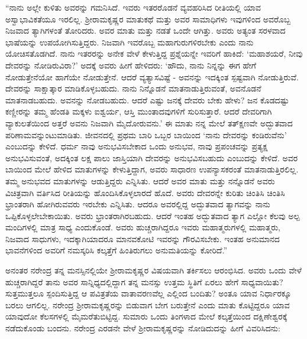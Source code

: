 “ನಾನು ಅಲ್ಲೇ ಕುಳಿತು ಅವರನ್ನು ಗಮನಿಸಿದೆ. ಇವರು ಇತರರೊಡನೆ ವ್ಯವಹರಿಸಿದ ರೀತಿಯಲ್ಲಿ ಯಾವ ಅಸ್ವಾಭಾವಿಕತೆಯೂ ಇರಲಿಲ್ಲ. ಶ‍್ರೀರಾಮಕೃಷ್ಣರ ಮಾತುಕಥೆ ಮತ್ತು ಅವರ ಸಾಮಾಧಿಗಳು ಇವುಗಳಿಂದ ಅವರೊಬ್ಬ ನಿಜವಾದ ತ್ಯಾಗಿಗಳಂತೆ ತೋರಿದರು. ಅವರ ಮಾತು ಮತ್ತು ನಡತೆ ಒಂದೇ ಆಗಿತ್ತು. ಅವರು ಅತ್ಯಂತ ಸರಳವಾದ ಭಾಷೆಯನ್ನು ಉಪಯೋಗಿಸುತ್ತಿದ್ದರು. ನಿಜವಾಗಿ ಇವರೊಬ್ಬ ಮಹಾಗುರುಗಳಿರಬೇಕು ಎಂದು ನಾನು ಯೋಚಿಸತೊಡಗಿದೆ. ನಾನು ಇತರರನ್ನು ಅನೇಕ ವೇಳೆ ಕೇಳುತ್ತಿದ್ದ ಪ್ರಶ್ನೆಯನ್ನೇ ಇವರಿಗೆ ಹಾಕಿದೆ: ‘ಮಹಾಶಯರೆ, ನೀವು ದೇವರನ್ನು ನೋಡಿರುವಿರಾ?’ ಅದಕ್ಕೆ ಅವರು ಹೀಗೆ ಹೇಳಿದರು: ‘ಹೌದು, ನಾನು ನಿನ್ನನ್ನು ಈಗ ಹೇಗೆ ನೋಡುತ್ತೇನೆಯೋ ಹಾಗೆಯೇ ನೋಡುತ್ತೇನೆ. ಆದರೆ ವ್ಯತ್ಯಾಸವಿಷ್ಟೆ - ಅವನನ್ನು ಇದಕ್ಕಿಂತ ಸ್ಪಷ್ಟವಾಗಿ ನೋಡುತ್ತಿರುವೆ. ದೇವರನ್ನು ಸಾಕ್ಷಾತ್ಕಾರ ಮಾಡಿಕೊಳ್ಳಬಹುದು. ನಾನು ನಿನ್ನೊಡನೆ ಮಾತನಾಡುತ್ತಿರುವಂತೆ, ಅವನೊಡನೆ ಮಾತನಾಡಬಹುದು. ಅವನನ್ನು ನೋಡಬಹುದು. ಆದರೆ ಎಷ್ಟು ಜನಕ್ಕೆ ದೇವರು ಬೇಕು ಹೇಳು? ಜನ ಕೊಡದಷ್ಟು ಕಣ್ಣೀರನ್ನು ತಮ್ಮ ಹೆಂಡತಿ ಮಕ್ಕಳು ಐಶ್ವರ್ಯ, ಆಸ್ತಿ ಮುಂತಾದವುಗಳಿಗೆ ಸುರಿಸುತ್ತಾರೆ. ಆದರೆ ದೇವರಿಗಾಗಿ ವ್ಯಾಕುಲತೆಯಿಂದ ಅತ್ತರೆ ಅವನು ನಿಜವಾಗಿ ಮೈದೋರುವನು.’ ಈ ಮಾತು ನನ್ನ ಮೇಲೆ ತತ್‍ಕ್ಷಣವೇ ಅದ್ಭುತವಾದ ಪರಿಣಾಮವನ್ನುಂಟುಮಾಡಿತು. ಜೀವನದಲ್ಲಿ ಪ್ರಥಮ ಬಾರಿ ಒಬ್ಬರ ಬಾಯಿಂದ ‘ನಾನು ದೇವರನ್ನು ಕಂಡಿರುವೆನು’ ಎಂಬುದನ್ನು ಕೇಳಿದೆ. ಧರ್ಮ ನಾವು ಅನುಭವಿಸಬೇಕಾದ ಒಂದು ಅನುಭವ, ನಾವು ಪ್ರಪಂಚವನ್ನು ಪ್ರತ್ಯಕ್ಷ ಅನುಭವಿಸುವಂತೆ, ಅದಕ್ಕಿಂತ ಲಕ್ಷ ಪಾಲು ಜಾಸ್ತಿಯಾಗಿ ದೇವರನ್ನು ಅನುಭವಿಸಬಹುದು ಎಂಬುದನ್ನು ಕೇಳಿದೆ. ಅವರ ಬಾಯಿಂದ ಮೇಲೆ ಹೇಳಿದ ಮಾತುಗಳನ್ನು ಕೇಳುತ್ತಿದ್ದಾಗ, ಅವರು ಸಾಧಾರಣ ಉಪನ್ಯಾಸಕರಂತೆ ಮಾತನಾಡುತ್ತಿರಲಿಲ್ಲ. ತಮ್ಮ ಅನುಭವದ ಮಾತುಗಳನ್ನು ಆಡುತ್ತಿದ್ದರು ಎನ್ನಿಸಿತು. ಆದರೆ ಅವರ ಮಾತು ಮತ್ತು ನನ್ನೊಡನೆ ಅವರು ವಿಚಿತ್ರವಾಗಿ ವರ್ತಿಸಿದ ರೀತಿಯನ್ನು ಹೊಂದಿಸಿಕೊಳ್ಳಲಾರದೆ ಹೊದೆ. ಅವರು ದೇವರನ್ನೇ ಕುರಿತು ಚಿಂತಿಸಿ ಚಿಂತಿಸಿ ಭ್ರಾಂತರಾಗಿ ಹೋಗಿರುವವರು ಇರಬೇಕು ಎನ್ನಿಸಿತು. ಆದರೂ ಅವರಲ್ಲಿದ್ದ ಅದ್ಭುತವಾದ ತ್ಯಾಗವನ್ನು ನಾನು ಒಪ್ಪಿಕೊಳ್ಳಲೇಬೇಕಾಯಿತು. ಅವರು ಭ್ರಾಂತರಾಗಿರಬಹುದು. ಆದರೆ ಇಂತಹ ಅದ್ಭುತವಾದ ತ್ಯಾಗ ಎಲ್ಲೋ ಕೆಲವು ಅಲ್ಪ ಮಂದಿಗಳಲ್ಲಿ ಮಾತ್ರ ಸಾಧ್ಯ ಎಂದುಕೊಂಡೆ. ಅವರು ಹುಚ್ಚರಾಗಿದ್ದರೂ ಇವರು ಮಹಾತ್ಮರುಗಳಲ್ಲಿ ಮಹಾತ್ಮರು, ನಿಜವಾದ ಸಾಧುಗಳು, ಇದಕ್ಕಾಗಿಯಾದರೂ ಮಾನವಕೋಟಿ ಇವರನ್ನು ಗೌರವಿಸಬೇಕು. ಇಂತಹ ಅನುಮಾನದ ಭಾವನೆಗಳಿಂದ ಅವರಿಗೆ ನಮಸ್ಕರಿಸಿ ಕಲ್ಕತ್ತೆಗೆ ಹಿಂತಿರುಗಲು ಅನುಮತಿಯನ್ನು ಕೋರಿದೆ.”

ಅನಂತರ ನರೇಂದ್ರ ತನ್ನ ಮನಸ್ಸಿನಲ್ಲಿಯೇ ಶ‍್ರೀರಾಮಕೃಷ್ಣರ ವಿಷಯವಾಗಿ ತರ್ಕಿಸಲು ಆರಂಭಿಸಿದ. ಅವರು ಒಂದು ವೇಳೆ ಹುಚ್ಚರಾಗಿದ್ದರೆ ತಾನು ಅವರ ಸಾನ್ನಿಧ್ಯದಲ್ಲಿದ್ದಾಗ ತನ್ನ ಮನಸ್ಸು ಉತ್ತಮ ಸ್ಥಿತಿಗೆ ಏರಲು ಹೇಗೆ ಸಾಧ್ಯವಾಯಿತು? ಸುತ್ತಮುತ್ತಲೂ ಸ್ಪಂದಿಸುತ್ತಿದ್ದ ಆ ಪವಿತ್ರತೆಯ ವಾತಾವರಣವೆಲ್ಲ ಎಲ್ಲಿಂದ ಬಂದಿತು? ಅಂತೂ ಯಾವ ನಿರ್ಧಾರಕ್ಕೂ ಬರಲು ಆಗಲಿಲ್ಲ. ನರೇಂದ್ರ ಶ‍್ರೀರಾಮಕೃಷ್ಣರನ್ನು ಬಿಡುವಾಗ ಬೇಗ ಬರುತ್ತೇನೆ ಎಂದು ಮಾತು ಕೊಟ್ಟಿದ್ದರೂ ಯಾವ ಯಾವುದೋ ಕೆಲಸಗಳಲ್ಲಿ ಮೈಮರೆತುಬಿಟ್ಟಿದ್ದ. ಸುಮಾರು ಒಂದು ತಿಂಗಳಾದ ಮೇಲೆ ಕಲ್ಕತ್ತೆಯಿಂದ ದಕ್ಷಿಣೇಶ್ವರಕ್ಕೆ ನಡೆದುಕೊಂಡು ಬಂದನು. ನರೇಂದ್ರ ಎರಡನೇ ವೇಳೆ ಶ‍್ರೀರಾಮಕೃಷ್ಣರನ್ನು ನೋಡಿದುದನ್ನು ಹೀಗೆ ವಿವರಿಸಿದನು:

